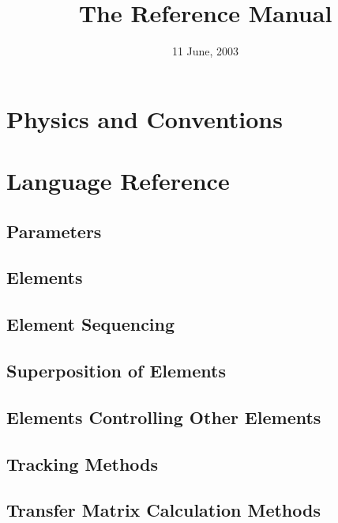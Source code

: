 \documentclass{book}
\begin{document}
\title{The \bmad Reference Manual}

\date{11 June, 2003}
\maketitle



\tableofcontents
\listoffigures
\listoftables

\part{Physics and Conventions}



\part{Language Reference}


\chapter{Parameters}
\chapter{Elements}
\chapter{Element Sequencing}
\chapter{Superposition of Elements}
\chapter{Elements Controlling Other Elements}
\chapter{Tracking Methods}
\chapter{Transfer Matrix Calculation Methods}
\end{document}
